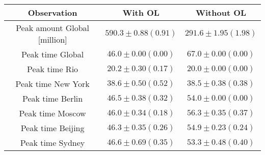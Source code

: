 \begin{tabular}[H]{c | c | c}
Observation & With OL & Without OL \\ \hline 
 Peak amount Global [million]& $590.3\pm 0.88 (0.91)$ & $291.6 \pm 1.95 (1.98)$\\
 Peak time Global & $46.0\pm 0.00( 0.00)$ & $67.0 \pm 0.00 (0.00)$\\
 Peak time Rio & $20.2\pm 0.30( 0.17)$ & $20.0 \pm 0.00 (0.00)$\\
 Peak time New York & $38.6\pm 0.50( 0.52)$ & $38.5 \pm 0.38 (0.38)$\\
 Peak time Berlin & $46.5\pm 0.38( 0.32)$ & $54.0 \pm 0.00 (0.00)$\\
 Peak time Moscow & $46.0\pm 0.34( 0.18)$ & $56.3 \pm 0.35 (0.37)$\\
 Peak time Beijing & $46.3\pm 0.35( 0.26)$ & $54.9 \pm 0.23 (0.24)$\\
 Peak time Sydney & $46.6\pm 0.69( 0.35)$ & $53.3 \pm 0.48 (0.40)$
\end{tabular}

